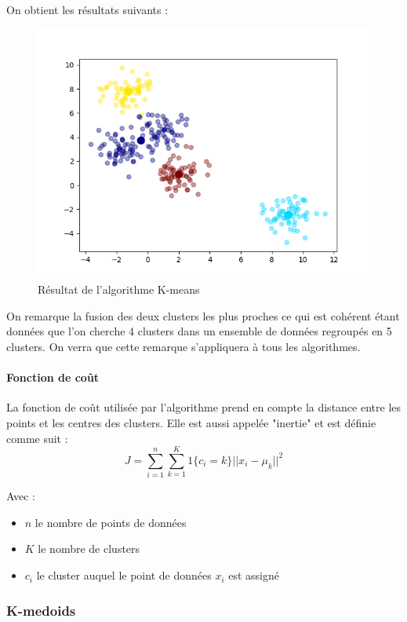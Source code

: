 \documentclass[french,a4paper,18pt]{article}
\begin{document}
On obtient les résultats suivants :
\begin{figure}[h]
    \centering
    \includegraphics[scale=0.5]{../images/short_simulation_kmeans.png}
    \caption{Résultat de l'algorithme K-means}\label{fig:short_simulation_kmeans}
\end{figure}

On remarque la fusion des deux clusters les plus proches ce qui est cohérent 
étant données que l'on cherche 4 clusters dans un ensemble de données regroupés en 5 clusters.
On verra que cette remarque s'appliquera à tous les algorithmes.

\paragraph{Fonction de coût}
La fonction de coût utilisée par l'algorithme prend en compte la distance entre les points et les centres des clusters.
Elle est aussi appelée "inertie" et est définie comme suit :
\begin{equation}
    J = \sum_{i=1}^{n} \sum_{k=1}^{K} 1\{c_{i} = k\} ||x_{i} - \mu_k||^2
    \label{eq:kmeans_cost}
\end{equation}

Avec :
\begin{itemize}
    \item $n$ le nombre de points de données
    \item $K$ le nombre de clusters
    \item $c_{i}$ le cluster auquel le point de données $x_{i}$ est assigné
\end{itemize}
\subsubsection{K-medoids}
\end{document}
